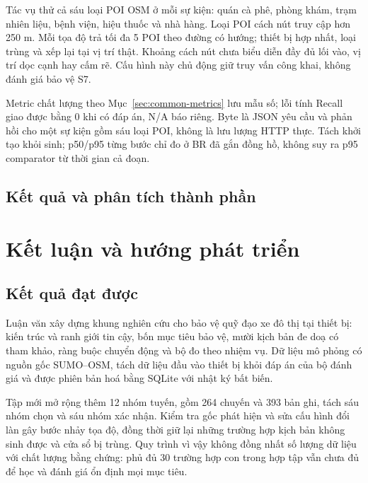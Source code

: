 Tác vụ thử cả sáu loại POI OSM ở mỗi sự kiện: quán cà phê, phòng khám, trạm nhiên liệu, bệnh viện, hiệu thuốc và nhà hàng. Loại POI cách nút truy cập hơn 250 m. Mỗi tọa độ trả tối đa 5 POI theo đường có hướng; thiết bị hợp nhất, loại trùng và xếp lại tại vị trí thật. Khoảng cách nút chưa biểu diễn đầy đủ lối vào, vị trí dọc cạnh hay cấm rẽ. Cấu hình này chủ động giữ truy vấn công khai, không đánh giá bảo vệ S7.

Metric chất lượng theo Mục~\ref{sec:common-metrics} lưu mẫu số; lỗi tính Recall giao được bằng 0 khi có đáp án, N/A báo riêng. Byte là JSON yêu cầu và phản hồi cho một sự kiện gồm sáu loại POI, không là lưu lượng HTTP thực. Tách khởi tạo khỏi sinh; p50/p95 từng bước chỉ đo ở BR đã gắn đồng hồ, không suy ra p95 comparator từ thời gian cả đoạn.

\section{Kết quả và phân tích thành phần}













\chapter{Kết luận và hướng phát triển}

\section{Kết quả đạt được}

Luận văn xây dựng khung nghiên cứu cho bảo vệ quỹ đạo xe đô thị tại thiết bị: kiến trúc và ranh giới tin cậy, bốn mục tiêu bảo vệ, mười kịch bản đe doạ có tham khảo, ràng buộc chuyển động và bộ đo theo nhiệm vụ. Dữ liệu mô phỏng có nguồn gốc SUMO--OSM, tách dữ liệu đầu vào thiết bị khỏi đáp án của bộ đánh giá và được phiên bản hoá bằng SQLite với nhật ký bất biến.

Tập mới mở rộng thêm 12 nhóm tuyến, gồm 264 chuyến và 393 bản ghi, tách sáu nhóm chọn và sáu nhóm xác nhận. Kiểm tra gốc phát hiện và sửa cấu hình đổi làn gây bước nhảy tọa độ, đồng thời giữ lại những trường hợp kịch bản không sinh được và cửa sổ bị trùng. Quy trình vì vậy không đồng nhất số lượng dữ liệu với chất lượng bằng chứng: phủ đủ 30 trường hợp con trong hợp tập vẫn chưa đủ để học và đánh giá ổn định mọi mục tiêu.


